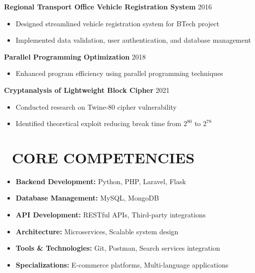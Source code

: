 \documentclass[10pt,a4paper]{article}
\begin{document}
\begin{paracol}{2}
\begin{rightcolumn}
\textbf{\color{darkblue}Regional Transport Office Vehicle Registration System} \hfill \textcolor{mediumgray}{\footnotesize 2016}
\begin{itemize}[leftmargin=10pt]
    \item Designed streamlined vehicle registration system for BTech project
    \item Implemented data validation, user authentication, and database management
\end{itemize}

\textbf{\color{darkblue}Parallel Programming Optimization} \hfill \textcolor{mediumgray}{\footnotesize 2018}
\begin{itemize}[leftmargin=10pt]
    \item Enhanced program efficiency using parallel programming techniques
\end{itemize}

\textbf{\color{darkblue}Cryptanalysis of Lightweight Block Cipher} \hfill \textcolor{mediumgray}{\footnotesize 2021}
\begin{itemize}[leftmargin=10pt]
    \item Conducted research on Twine-80 cipher vulnerability
    \item Identified theoretical exploit reducing break time from $2^{80}$ to $2^{78}$
\end{itemize}

\vspace{1mm}
\section*{\faWrench\ CORE COMPETENCIES}
\small
\begin{itemize}[leftmargin=10pt]
    \item \textbf{Backend Development:} Python, PHP, Laravel, Flask
    \item \textbf{Database Management:} MySQL, MongoDB
    \item \textbf{API Development:} RESTful APIs, Third-party integrations
    \item \textbf{Architecture:} Microservices, Scalable system design
    \item \textbf{Tools \& Technologies:} Git, Postman, Search services integration
    \item \textbf{Specializations:} E-commerce platforms, Multi-language applications
\end{itemize}

\end{rightcolumn}
\end{paracol}
\end{document}
